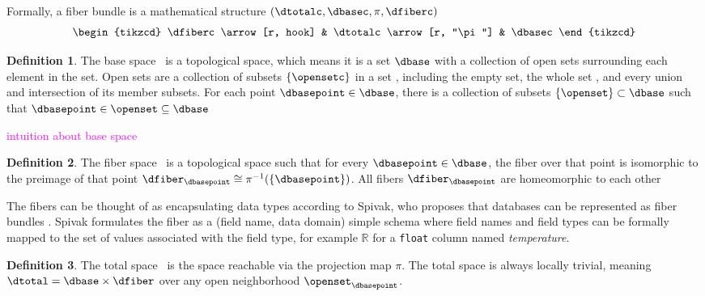 \documentclass[10pt,journal,compsoc]{IEEEtran}
\newcommand{\note}[1]{\textcolor{magenta}{#1}}
\theoremstyle{definition}
\newtheorem{definition}{Definition}[section]
\theoremstyle{remark}
\begin{document}
Formally, a fiber bundle is a mathematical structure $(\dtotalc, \dbasec, \pi, \dfiberc)$
\begin{equation}
  \label{eq:fiber_bundle}
  \begin{tikzcd}
      \dfiberc \arrow[r, hook] & \dtotalc \arrow[r, "\pi"] & \dbasec
  \end{tikzcd}
\end{equation}

\begin{definition}
The \textcolor{base}{base space} \dbasec\ is a topological space, which means it is a set $\dbase$ with a collection of open sets \cite{TopologyVsTopology} surrounding each element in the set. Open sets are a collection of subsets $\{\opensetc\}$ in a set \dbase, including the empty set, the whole set \dbase, and every union and intersection of its member subsets. For each point $\dbasepoint \in \dbase$, there is a collection of subsets $\{\openset\} \subset \dbase$ such that $\dbasepoint \in \openset \subseteq \dbase$ \cite{spanier1989algebraic, bradleyTopologyCategoricalApproach2020}  
\end{definition}
\note{intuition about base space}

\begin{definition} The \textcolor{fiber}{fiber space} \dfiberc\ is a topological space such that for every $\dbasepoint \in \dbase$, the fiber over that point is isomorphic to the preimage of that point $\dfiber_{\dbasepoint} \cong \pi^{-1}(\{\dbasepoint\})$. All fibers $\dfiber_{\dbasepoint}$ are homeomorphic to each other \cite{spanier1989algebraic, hatcherAlgebraicTopology2002}
\end{definition}

The fibers can be thought of as encapsulating data types according to Spivak, who proposes that databases can be represented as fiber bundles \cite{spivakSIMPLICIALDATABASES,spivakDatabasesAreCategories2010}. Spivak formulates the fiber as a (field name, data domain) simple schema where field names and field types can be formally mapped to the set of values associated with the field type, for example $\mathbb{R}$ for a \texttt{float} column named \textit{temperature}. 

\begin{definition} The \textcolor{total}{total space} \dtotalc\ is the space reachable via the projection map $\pi$. The total space is always locally trivial, meaning $\dtotal = \dbase \times \dfiber$ over any open neighborhood $\openset_{\dbasepoint}$. 
\end{definition}
\end{document}
